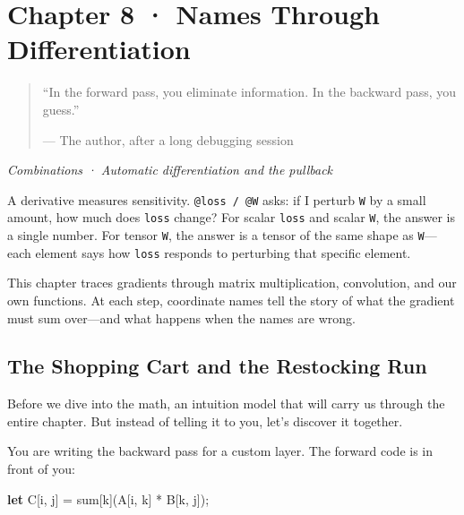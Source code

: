 \documentclass[11pt,titlepage]{article}
\newenvironment{Shaded}{}{}
\newcommand{\KeywordTok}[1]{\textcolor[rgb]{0.00,0.44,0.13}{\textbf{#1}}}
\newcommand{\NormalTok}[1]{#1}
\newcommand{\OperatorTok}[1]{\textcolor[rgb]{0.40,0.40,0.40}{#1}}
\begin{document}
\newpage

\hypertarget{chapter-8-names-through-differentiation}{%
\section{Chapter 8 · Names Through
Differentiation}\label{chapter-8-names-through-differentiation}}

\begin{quote}
``In the forward pass, you eliminate information. In the backward pass,
you guess.''

--- The author, after a long debugging session
\end{quote}

\emph{Combinations · Automatic differentiation and the pullback}

\vspace{2em}

A derivative measures sensitivity. \texttt{@loss\ /\ @W} asks: if I
perturb \texttt{W} by a small amount, how much does \texttt{loss}
change? For scalar \texttt{loss} and scalar \texttt{W}, the answer is a
single number. For tensor \texttt{W}, the answer is a tensor of the same
shape as \texttt{W}---each element says how \texttt{loss} responds to
perturbing that specific element.

This chapter traces gradients through matrix multiplication,
convolution, and our own functions. At each step, coordinate names tell
the story of what the gradient must sum over---and what happens when the
names are wrong.

\vspace{2em}

\hypertarget{the-shopping-cart-and-the-restocking-run}{%
\subsection{The Shopping Cart and the Restocking
Run}\label{the-shopping-cart-and-the-restocking-run}}

Before we dive into the math, an intuition model that will carry us
through the entire chapter. But instead of telling it to you, let's
discover it together.

You are writing the backward pass for a custom layer. The forward code
is in front of you:

\begin{Shaded}
\begin{Highlighting}[]
\KeywordTok{let}\NormalTok{ C}\OperatorTok{[}\NormalTok{i, j}\OperatorTok{]}\NormalTok{ = sum}\OperatorTok{[}\NormalTok{k}\OperatorTok{]}\NormalTok{(A}\OperatorTok{[}\NormalTok{i, k}\OperatorTok{]}\NormalTok{ * B}\OperatorTok{[}\NormalTok{k, j}\OperatorTok{]}\NormalTok{);}
\end{Highlighting}
\end{Shaded}
\end{document}
